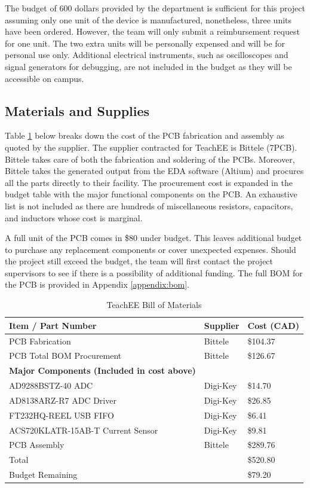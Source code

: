 \documentclass[letterpaper,12pt]{article}
\begin{document}
The budget of 600 dollars provided by the department is sufficient for this
project assuming only one unit of the device is manufactured, nonetheless,
three units have been ordered. However, the team will only submit a reimbursement
request for one unit. The two extra units will be personally expensed and will
be for personal use only. Additional electrical instruments, such as oscilloscopes
and signal generators for debugging, are not included in the budget as they will be
accessible on campus.

\subsection{Materials and Supplies}
Table \ref{tab:abbreviated-bom} below breaks down the cost of the PCB
fabrication and assembly as quoted by the supplier. The supplier contracted for
TeachEE is Bittele (7PCB). Bittele takes care of both the fabrication and
soldering of the PCBs. Moreover, Bittele takes the generated output from the EDA
software (Altium) and procures all the parts directly to their facility. The
procurement cost is expanded in the budget table with the major functional
components on the PCB. An exhaustive list is not included as there are hundreds
of miscellaneous resistors, capacitors, and inductors whose cost is marginal.

A full unit of the PCB comes in \$80 under budget. This leaves
additional budget to purchase any replacement components or
cover unexpected expenses. Should the project still exceed the budget, the team
will first contact the project supervisors to see if there is a possibility of
additional funding. The full BOM for the PCB is provided in
Appendix \ref{appendix:bom}.

\begin{table}[H]
    \caption{TeachEE Bill of Materials}
    \begin{tabularx}{\textwidth}{l|l|l}
        \textbf{Item / Part Number} & \textbf{Supplier} & \textbf{Cost (CAD)} \\
        \hline
        PCB Fabrication & Bittele & \$104.37\\
        PCB Total BOM Procurement & Bittele & \$126.67\\
        \hline
        \textbf{Major Components (Included in cost above)}& &\\
        \hline
        AD9288BSTZ-40 ADC & Digi-Key & \$14.70\\
        AD8138ARZ-R7 ADC Driver & Digi-Key & \$26.85\\
        FT232HQ-REEL USB FIFO & Digi-Key & \$6.41\\
        ACS720KLATR-15AB-T Current Sensor & Digi-Key & \$9.81\\
        \hline
        PCB Assembly & Bittele & \$289.76\\
        \hline
        Total & & \$520.80\\
        \hline
        Budget Remaining & & \$79.20
    \end{tabularx} 
\label{tab:abbreviated-bom}
\end{table}
\end{document}
